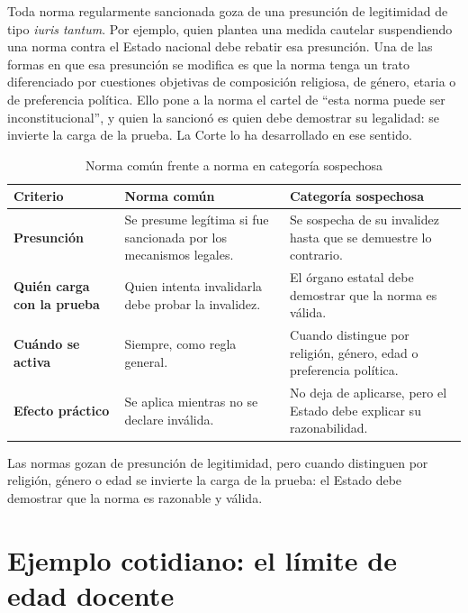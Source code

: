 \documentclass[12pt,oneside]{book}
\begin{document}
Toda norma regularmente sancionada goza de una presunción de legitimidad de tipo \textit{iuris tantum}. Por ejemplo, quien plantea una medida cautelar suspendiendo una norma contra el Estado nacional debe rebatir esa presunción. Una de las formas en que esa presunción se modifica es que la norma tenga un trato diferenciado por cuestiones objetivas de composición religiosa, de género, etaria o de preferencia política. Ello pone a la norma el cartel de ``esta norma puede ser inconstitucional'', y quien la sancionó es quien debe demostrar su legalidad: se invierte la carga de la prueba. La Corte lo ha desarrollado en ese sentido.

\begin{table}[H]
\centering
\caption{Norma común frente a norma en categoría sospechosa}
\small
\begin{tabularx}{\textwidth}{
    >{\raggedright\arraybackslash}p{}
    >{\raggedright\arraybackslash}X
    >{\raggedright\arraybackslash}X
}
\toprule
\textbf{Criterio} & \textbf{Norma común} & \textbf{Categoría sospechosa} \\
\midrule
\textbf{Presunción} & Se presume legítima si fue sancionada por los mecanismos legales. & Se sospecha de su invalidez hasta que se demuestre lo contrario. \\
\textbf{Quién carga con la prueba} & Quien intenta invalidarla debe probar la invalidez. & El órgano estatal debe demostrar que la norma es válida. \\
\textbf{Cuándo se activa} & Siempre, como regla general. & Cuando distingue por religión, género, edad o preferencia política. \\
\textbf{Efecto práctico} & Se aplica mientras no se declare inválida. & No deja de aplicarse, pero el Estado debe explicar su razonabilidad. \\
\bottomrule
\end{tabularx}
\end{table}

\begin{important}
Las normas gozan de presunción de legitimidad, pero cuando distinguen por religión, género o edad se invierte la carga de la prueba: el Estado debe demostrar que la norma es razonable y válida.
\end{important}

\section{Ejemplo cotidiano: el límite de edad docente}
\end{document}
